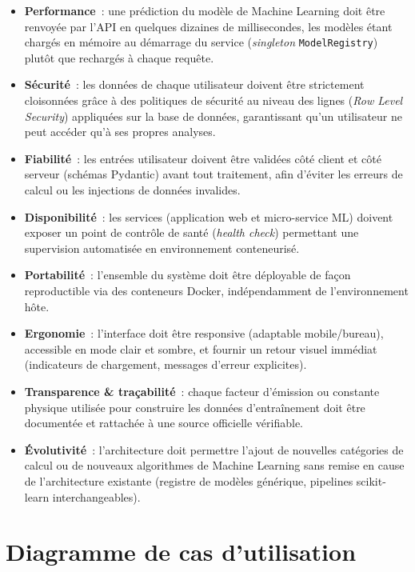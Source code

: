 \begin{itemize}[label=\textbullet,font=\normalsize]
    \item \textbf{Performance}~: une prédiction du modèle de Machine Learning doit être renvoyée par l'API en quelques dizaines de millisecondes, les modèles étant chargés en mémoire au démarrage du service (\textit{singleton} \texttt{ModelRegistry}) plutôt que rechargés à chaque requête.
    \item \textbf{Sécurité}~: les données de chaque utilisateur doivent être strictement cloisonnées grâce à des politiques de sécurité au niveau des lignes (\textit{Row Level Security}) appliquées sur la base de données, garantissant qu'un utilisateur ne peut accéder qu'à ses propres analyses.
    \item \textbf{Fiabilité}~: les entrées utilisateur doivent être validées côté client et côté serveur (schémas Pydantic) avant tout traitement, afin d'éviter les erreurs de calcul ou les injections de données invalides.
    \item \textbf{Disponibilité}~: les services (application web et micro-service ML) doivent exposer un point de contrôle de santé (\textit{health check}) permettant une supervision automatisée en environnement conteneurisé.
    \item \textbf{Portabilité}~: l'ensemble du système doit être déployable de façon reproductible via des conteneurs Docker, indépendamment de l'environnement hôte.
    \item \textbf{Ergonomie}~: l'interface doit être responsive (adaptable mobile/bureau), accessible en mode clair et sombre, et fournir un retour visuel immédiat (indicateurs de chargement, messages d'erreur explicites).
    \item \textbf{Transparence \& traçabilité}~: chaque facteur d'émission ou constante physique utilisée pour construire les données d'entraînement doit être documentée et rattachée à une source officielle vérifiable.
    \item \textbf{Évolutivité}~: l'architecture doit permettre l'ajout de nouvelles catégories de calcul ou de nouveaux algorithmes de Machine Learning sans remise en cause de l'architecture existante (registre de modèles générique, pipelines scikit-learn interchangeables).
\end{itemize}

\section{Diagramme de cas d'utilisation}

